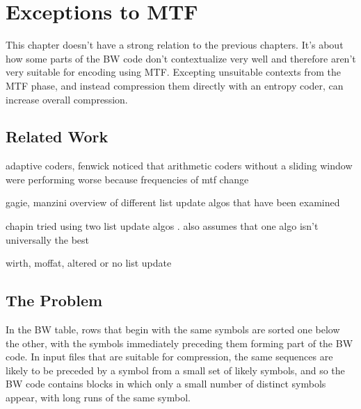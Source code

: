 \documentclass[a4paper]{scrreprt}
\begin{document}
\chapter{Exceptions to MTF}


This chapter doesn't have a strong relation to the previous chapters. It's about
how some parts of the BW code don't contextualize very well and therefore aren't
very suitable for encoding using MTF. Excepting unsuitable contexts from the MTF
phase, and instead compression them directly with an entropy coder, can increase
overall compression.

\section{Related Work}

adaptive coders, fenwick noticed that arithmetic coders without a sliding window
were performing worse because frequencies of mtf change\cite{fenwick1996block}

gagie, manzini overview of different list update algos that have been
examined\cite{gagie2007listupdate}

chapin tried using two list update algos
\cite{chapin2000switching,chapin2001diss}. also assumes that one algo isn't
universally the best

wirth, moffat, altered or no list update \cite{wirth2001ranks}

\section{The Problem}


In the BW table, rows that begin with the same symbols are sorted one below the
other, with the symbols immediately preceding them forming part of the BW code.
In input files that are suitable for compression, the same sequences are likely
to be preceded by a symbol from a small set of likely symbols, and so the BW
code contains blocks in which only a small number of distinct symbols appear,
with long runs of the same symbol.
\end{document}
